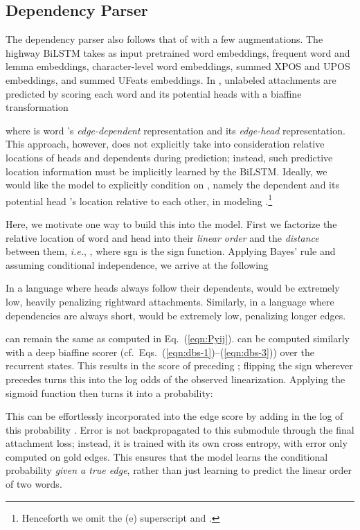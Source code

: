 \documentclass[11pt,a4paper]{article}
\begin{document}
\subsection{Dependency Parser}
The dependency parser also follows that of \cite{dozat-qi-manning:2017:K17-3} with a few augmentations. The highway BiLSTM takes as input pretrained word embeddings, frequent word and lemma embeddings, character-level word embeddings, summed XPOS and UPOS embeddings, and summed UFeats embeddings. In \cite{dozat-qi-manning:2017:K17-3}, unlabeled attachments are predicted by scoring each word  and its potential heads with a biaffine transformation

where  is word 's \emph{edge-dependent} representation and  its \emph{edge-head} representation.
This approach, however, does not explicitly take into consideration relative locations of heads and dependents during prediction; instead, such predictive location information must be implicitly learned by the BiLSTM. Ideally, we would like the model to explicitly condition on , namely the dependent  and its potential head 's location relative to each other, in modeling .\footnote{Henceforth we omit the (e) superscript and .}


Here, we motivate one way to build this into the model. First we factorize the relative location of word  and head  into their \emph{linear order} and the \emph{distance} between them, \emph{i.e.}, , where sgn is the sign function. Applying Bayes' rule and assuming conditional independence, we arrive at the following

In a language where heads always follow their dependents,  would be extremely low, heavily penalizing rightward attachments. Similarly, in a language where dependencies are always short,  would be extremely low, penalizing longer edges.

 can remain the same as computed in Eq.~(\ref{eqn:Pyij}).
 can be computed similarly  with a deep biaffine scorer (cf.\ Eqs.~(\ref{eqn:dbs-1})--(\ref{eqn:dbs-3})) over the recurrent states.
This results in the score of  preceding ; flipping the sign wherever  precedes  turns this into the log odds of the observed linearization.
Applying the sigmoid function then turns it into a probability:

This can be effortlessly incorporated into the edge score by adding in the log of this probability . Error is not backpropagated to this submodule through the final attachment loss; instead, it is trained with its own cross entropy, with error only computed on gold edges. This ensures that the model learns the conditional probability \emph{given a true edge}, rather than just learning to predict the linear order of two words.
\end{document}
